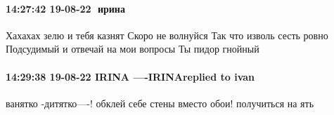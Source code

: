 \paragraph{14:27:42 19-08-22 🍏ирина 🍇🍇}

Хахахах зелю и тебя казнят
Скоро не волнуйся
Так что изволь сесть ровно
Подсудимый и отвечай на мои вопросы
Ты пидор гнойный

\paragraph{14:29:38 19-08-22 IRINA ----IRINAreplied to ivan}

ванятко -дитятко----! обклей себе стены вместо обои! получиться на ять
